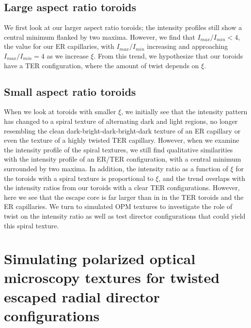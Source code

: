 \subsection{Large aspect ratio toroids}
We first look at our larger aspect ratio toroids; the intensity profiles still show a central minimum flanked by two maxima.
However, we find that $I_{max}/I_{min} < 4$, the value for our ER capillaries, with $I_{max}/I_{min}$ increasing and approaching $I_{max}/I_{min} = 4$ as we increase $\xi$.
From this trend, we hypothesize that our toroids have a TER configuration, where the amount of twist depends on $\xi$.


\subsection{Small aspect ratio toroids}
When we look at toroids with smaller $\xi$, we initially see that the intensity pattern has changed to a spiral texture of alternating dark and light regions, no longer resembling the clean dark-bright-dark-bright-dark texture of an ER capillary or even the texture of a highly twisted TER capillary.
However, when we examine the intensity profile of the spiral textures, we still find qualitative similarities with the intensity profile of an ER/TER configuration, with a central minimum surrounded by two maxima.
In addition, the intensity ratio as a function of $\xi$ for the toroids with a spiral texture is proportional to $\xi$, and the trend overlaps with the intensity ratios from our toroids with a clear TER configurations.
However, here we see that the escape core is far larger than in in the TER toroids and the ER capillaries.
We turn to simulated OPM textures to investigate the role of twist on the intensity ratio as well as test director configurations that could yield this spiral texture.




\section{Simulating polarized optical microscopy textures for twisted escaped radial director configurations}
